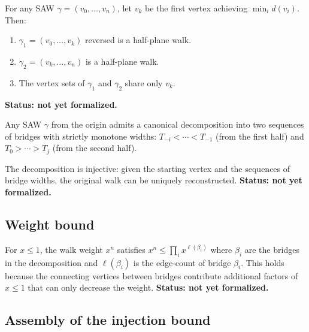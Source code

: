 \begin{lemma}\label{lem:split_deepest}
  For any SAW $\gamma = (v_0, \ldots, v_n)$, let $v_k$ be the first vertex
  achieving $\min_i d(v_i)$. Then:
  \begin{enumerate}
  \item $\gamma_1 = (v_0, \ldots, v_k)$ reversed is a half-plane walk.
  \item $\gamma_2 = (v_k, \ldots, v_n)$ is a half-plane walk.
  \item The vertex sets of $\gamma_1$ and $\gamma_2$ share only $v_k$.
  \end{enumerate}
  \textbf{Status: not yet formalized.}
\end{lemma}

\begin{theorem}\label{thm:hw_decomp_algorithm}
  Any SAW $\gamma$ from the origin admits a canonical decomposition into
  two sequences of bridges with strictly monotone widths:
  $T_{-i} < \cdots < T_{-1}$ (from the first half) and
  $T_0 > \cdots > T_j$ (from the second half).

  The decomposition is injective: given the starting vertex and the
  sequences of bridge widths, the original walk can be uniquely
  reconstructed.
  \textbf{Status: not yet formalized.}
\end{theorem}

\subsection{Weight bound}

\begin{lemma}\label{lem:weight_factor}
  For $x \leq 1$, the walk weight $x^n$ satisfies
  $x^n \leq \prod_i x^{\ell(\beta_i)}$
  where $\beta_i$ are the bridges in the decomposition and $\ell(\beta_i)$
  is the edge-count of bridge $\beta_i$.
  This holds because the connecting vertices between bridges contribute
  additional factors of $x \leq 1$ that can only decrease the weight.
  \textbf{Status: not yet formalized.}
\end{lemma}

\subsection{Assembly of the injection bound}

